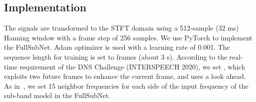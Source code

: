 \documentclass{article}
\begin{document}
\subsection{Implementation}
The signals are transformed to the STFT domain using a 512-sample (32 ms) Hanning window with a frame step of 256 samples.
We use PyTorch to implement the FullSubNet.
Adam optimizer is used with a learning rate of 0.001.
The sequence length for training is set to  frames (about 3 s).
According to the real-time requirement of the DNS Challenge (INTERSPEECH 2020), we set , which exploits two future frames to enhance the current frame, and uses a  look ahead.
As in~\cite{sub_dns_xiaofeili}, we set 15 neighbor frequencies for each side of the input frequency of the sub-band model in the FullSubNet.

\begin{table*}[!t]
    \centering
    \small
    \caption{The performance in terms of WB-PESQ [MOS], NB-PESQ [MOS], STOI [\%], and SI-SDR [dB] on the DNS challege test dataset.}
    \renewcommand\arraystretch{1}
\end{table*}
\end{document}
